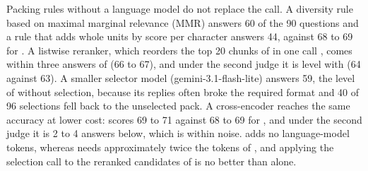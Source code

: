 Packing rules without a language model do not replace the call. A diversity rule based on maximal marginal relevance (MMR) \citep{carbonell1998mmr} answers 60 of the 90 questions and a rule that adds whole units by score per character answers 44, against 68 to 69 for \lexb{}. A listwise reranker, which reorders the top 20 chunks of \hybrid{} in one call \citep{sun2023rankgpt}, comes within three answers of \lexb{} (66 to 67), and under the second judge it is level with \hr{} (64 against 63). A smaller selector model (gemini-3.1-flash-lite) answers 59, the level of \lexb{} without selection, because its replies often broke the required format and 40 of 96 selections fell back to the unselected pack. A cross-encoder reaches the same accuracy at lower cost: \hr{} scores 69 to 71 against 68 to 69 for \lexb{}, and under the second judge it is 2 to 4 answers below, which is within noise. \hr{} adds no language-model tokens, whereas \lexb{} needs approximately twice the tokens of \hybrid{}, and applying the selection call to the reranked candidates of \hr{} is no better than \hr{} alone.

